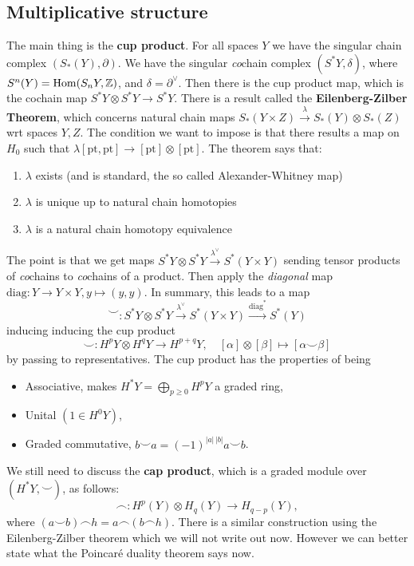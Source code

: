     \subsection{Multiplicative structure}
    The main thing is the \textbf{cup product}. For all spaces  $Y$ we have the singular chain complex $(S_*(Y), \partial )$. We have the singular \emph{co}chain complex $(S^*Y, \delta)$, where $S^n (Y) = \operatorname{Hom} (S_n Y, \mathbb{Z})$, and $\delta = \partial  ^{\vee}$. Then there is the cup product map, which is the cochain map $S^* Y \otimes S^* Y \to  S^* Y$. There is a result called the \textbf{Eilenberg-Zilber Theorem}, which concerns natural chain maps $S_*(Y \times Z) \xrightarrow{\lambda}   S_*(Y) \otimes S_* (Z)$ wrt spaces $Y,Z$. The condition we want to impose is that there results a map on $H_0$ such that $\lambda[\mathrm{pt,pt}] \to  [\mathrm{pt}] \otimes [\mathrm{pt}]$. The theorem says that:
    \begin{enumerate}[label=(\roman*)]
    \setlength\itemsep{-.2em}
\item  $\lambda$ exists (and is standard, the so called Alexander-Whitney map)
\item $\lambda$ is unique up to natural chain homotopies
\item $\lambda$ is a natural chain homotopy equivalence
    \end{enumerate}
    The point is that we get maps $S^* Y \otimes S^* Y \xrightarrow{\lambda^{\vee}}   S^*(Y \times Y)$ sending tensor products of \emph{co}chains to \emph{co}chains of a product. Then apply the \emph{diagonal} map $\mathrm{diag}\colon Y \to Y\times Y , y \mapsto (y,y)$. In summary, this leads to a map\[
        \smile \colon S^* Y \otimes S^* Y \xrightarrow{\lambda ^{\vee}} S^* (Y \times Y ) \xrightarrow{\mathrm{diag}^*} S^*(Y)
    \] inducing inducing the cup product \[
    \smile \colon H^p Y \otimes H^q Y \to   H ^{p+q} Y,\quad [\alpha ]\otimes [\beta ] \mapsto  [\alpha  \smile \beta ]
    \] by  passing to representatives. The cup product has the properties of being 
    \begin{itemize}
    \setlength\itemsep{-.2em}
        \item Associative, makes $H^* Y = \bigoplus _{ p \geq 0}H^p Y$ a graded ring,
        \item Unital $(1 \in H^0 Y)$,
        \item Graded commutative, $b \smile a = (-1) ^{|a| \, |b|} a \smile b$.
    \end{itemize}
    We still need to discuss the \textbf{cap product}, which is a graded module over $(H^* Y, \smile)$, as follows: \[
        \frown \colon H^p (Y) \otimes H_q(Y) \to H_{q-p}(Y),
    \] where $(a\smile b)\frown h = a\frown (b \frown h)$. There is a similar construction using the Eilenberg-Zilber theorem which we will not write out now. However we can better state what the Poincar\'e duality theorem says now.
